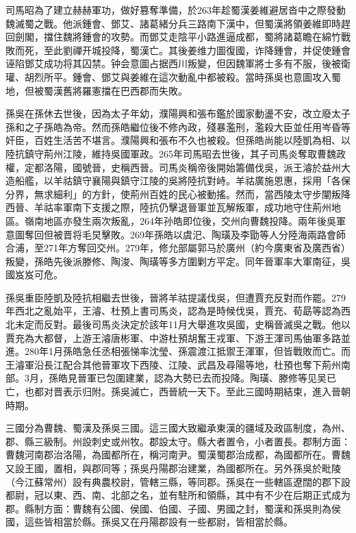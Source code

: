 司馬昭為了建立赫赫軍功，做好篡奪準備，於263年趁蜀漢姜維避居沓中之際發動魏滅蜀之戰。他派鍾會、鄧艾、諸葛緒分兵三路南下漢中，但蜀漢將領姜維即時趕回劍閣，擋住魏將鍾會的攻勢。而鄧艾走陰平小路進逼成都，蜀將諸葛瞻在綿竹戰敗而死，至此劉禪开城投降，蜀漢亡。其後姜维力圖復國，诈降鍾會，并促使鍾會诬陷鄧艾成功将其囚禁。钟会意圖占据西川叛變，但因魏軍將士多有不服，後被衛瓘、胡烈所平。鍾會、鄧艾與姜維在這次動亂中都被殺。當時孫吳也意圖攻入蜀地，但被蜀漢舊將羅憲擋在巴西郡而失敗。

孫吳在孫休去世後，因為太子年幼，濮陽興和張布鑑於國家動盪不安，改立廢太子孫和之子孫皓為帝。然而孫皓繼位後不修內政，殘暴濫刑，濫殺大臣並任用岑昏等奸臣，百姓生活苦不堪言。濮陽興和張布不久也被殺。但孫皓尚能以陸凱為相、以陸抗鎮守荊州江陵，維持吳國軍政。265年司馬昭去世後，其子司馬炎奪取曹魏政權，定都洛陽，國號晉，史稱西晉。司馬炎稱帝後開始籌備伐吳，派王濬於益州大造船艦，以羊祜鎮守襄陽與鎮守江陵的吳將陸抗對峙。羊祜廣施恩惠，採用「各保分界，無求細利」的方針，使荊州百姓的民心被動搖。然而，當西陵太守步闡叛降西晉、羊祜率軍南下支援之際，陸抗仍擊退晉軍並瓦解叛軍，成功地守住荊州地區。嶺南地區亦發生兩次叛亂，264年孙皓即位後，交州向曹魏投降。兩年後吳軍意圖奪回但被晋将毛炅擊敗。269年孫皓以虞汜、陶璜及李勖等人分陸海兩路會師合浦，至271年方奪回交州。279年，修允部屬郭马於廣州（約今廣東省及廣西省）叛變，孫皓先後派滕修、陶浚、陶璜等多方圍剿方平定。同年晉軍率大軍南征，吳國岌岌可危。

孫吳重臣陸凱及陸抗相繼去世後，晉將羊祜提議伐吳，但遭賈充反對而作罷。279年西北之亂始平，王濬、杜預上書司馬炎，認為是時候伐吳，賈充、荀勗等認為西北未定而反對。最後司馬炎決定於該年11月大舉進攻吳國，史稱晉滅吳之戰。他以賈充為大都督，上游王濬唐彬軍、中游杜預胡奮王戎軍、下游王渾司馬伷軍多路並進。280年1月孫皓急任丞相張悌率沈瑩、孫震渡江抵禦王渾軍，但皆戰敗而亡。而王濬軍沿長江配合其他晉軍攻下西陵、江陵、武昌及尋陽等地，杜預也奪下荊州南部。3月，孫皓見晉軍已包圍建業，認為大勢已去而投降。陶璜、滕修等见吴已亡，也都对晋表示归附。孫吳滅亡，西晉統一天下。至此三國時期結束，進入晉朝時期。

三國分為曹魏、蜀漢及孫吳三國。這三國大致繼承東漢的疆域及政區制度，為州、郡、縣三級制。州設刺史或州牧。郡設太守。縣大者置令，小者置長。郡制方面：曹魏河南郡治洛陽，為國都所在，稱河南尹。蜀漢蜀郡治成都，為國都所在。曹魏又設王國，置相，與郡同等；孫吳丹陽郡治建業，為國都所在。另外孫吳於毗陵（今江蘇常州）設有典農校尉，管轄三縣，等同郡。孫吳在一些轄區遼闊的郡下設都尉，冠以東、西、南、北部之名，並有駐所和領縣，其中有不少在后期正式成为郡。縣制方面：曹魏有公國、侯國、伯國、子國、男國之封，蜀漢和孫吳則為侯國，這些皆相當於縣。孫吳又在丹陽郡設有一些都尉，皆相當於縣。

